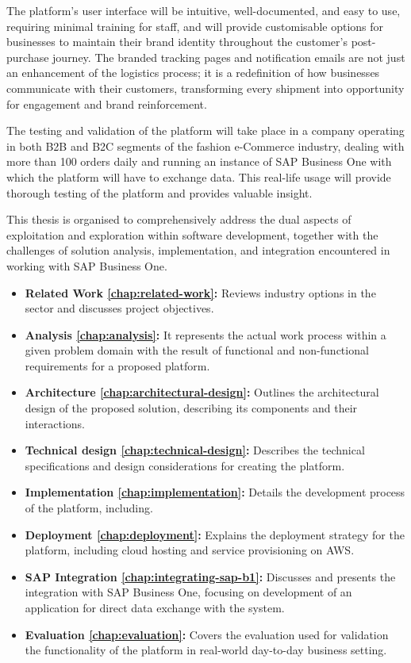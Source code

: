 The platform's user interface will be intuitive, well-documented, and easy to use, requiring minimal training for staff, and will provide customisable options for businesses to maintain their brand identity throughout the customer's post-purchase journey.
The branded tracking pages and notification emails are not just an enhancement of the logistics process; it is a redefinition of how businesses communicate with their customers, transforming every shipment into opportunity for engagement and brand reinforcement.

The testing and validation of the platform will take place in a company operating in both \ac{B2B} and \ac{B2C} segments of the fashion e-Commerce industry, dealing with more than 100 orders daily and running an instance of SAP Business One with which the platform will have to exchange data. 
This real-life usage will provide thorough testing of the platform and provides valuable insight.

% 

This thesis is organised to comprehensively address the dual aspects of exploitation and exploration within software development, together with the challenges of solution analysis, implementation, and integration encountered in working with SAP Business One.

\begin{itemize}
    \item \textbf{Related Work \ref{chap:related-work}:} Reviews industry options in the sector and discusses project objectives.
    \item \textbf{Analysis \ref{chap:analysis}:} It represents the actual work process within a given problem domain with the result of functional and non-functional requirements for a proposed platform.
    \item \textbf{Architecture \ref{chap:architectural-design}:} Outlines the architectural design of the proposed solution, describing its components and their interactions.
    \item \textbf{Technical design \ref{chap:technical-design}:} Describes the technical specifications and design considerations for creating the platform.
    \item \textbf{Implementation \ref{chap:implementation}:} Details the development process of the platform, including.
    \item \textbf{Deployment \ref{chap:deployment}:} Explains the deployment strategy for the platform, including cloud hosting and service provisioning on \ac{AWS}.
    \item \textbf{SAP Integration \ref{chap:integrating-sap-b1}:} Discusses and presents the integration with SAP Business One, focusing on development of an application for direct data exchange with the system. 
    \item \textbf{Evaluation \ref{chap:evaluation}:} Covers the evaluation used for validation the functionality of the platform in real-world day-to-day business setting.
\end{itemize}